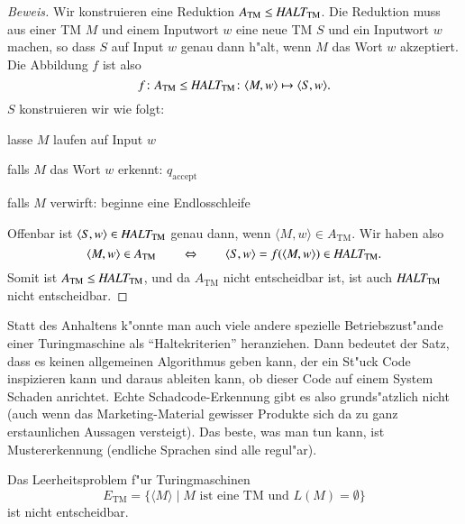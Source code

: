 \begin{proof}[Beweis]
Wir konstruieren eine Reduktion
$
A_{\text{TM}}
\le
\text{\it HALT}_{\text{TM}}
$.
Die Reduktion muss aus einer TM $M$ und einem Inputwort $w$ eine
neue TM $S$ und ein Inputwort $w$ machen, so dass $S$ auf
Input $w$ genau dann h"alt, wenn $M$ das Wort $w$ akzeptiert. Die Abbildung
$f$ ist also
\[
f\colon 
A_{\text{TM}}
\le
\text{\it HALT}_{\text{TM}}
\colon
\langle M,w\rangle\mapsto \langle S,w\rangle.
\]
$S$ konstruieren wir wie folgt:
\medskip
\begin{compactenum}
\item lasse $M$ laufen auf Input $w$
\item falls $M$ das Wort $w$ erkennt: $q_{\text{accept}}$
\item falls $M$ verwirft: beginne eine Endlosschleife
\end{compactenum}
\medskip
Offenbar ist
$\langle S,w\rangle\in \text{\it HALT}_{\text{TM}}$
genau dann, wenn $\langle M,w\rangle\in A_{\text{TM}}$.
Wir haben also
\[
\langle M,w\rangle\in A_{\text{TM}}
\qquad
\Leftrightarrow
\qquad
\langle S,w\rangle=f(\langle M,w\rangle)
\in \text{\it HALT}_{\text{TM}}.
\]
Somit ist 
$A_{\text{TM}}\le\text{\it HALT}_{\text{TM}}$, und da
$A_{\text{TM}}$ nicht entscheidbar ist, ist auch
$\text{\it HALT}_{\text{TM}}$ nicht entscheidbar.
\end{proof}
Statt des Anhaltens k"onnte man auch viele andere spezielle
Betriebszust"ande einer Turingmaschine als ``Haltekriterien''
heranziehen. Dann bedeutet der Satz, dass es keinen allgemeinen
Algorithmus geben kann, der ein St"uck Code inspizieren kann und
daraus ableiten kann, ob dieser Code auf einem System Schaden
anrichtet. Echte Schadcode-Erkennung gibt es also grunds"atzlich
nicht (auch wenn das Marketing-Material gewisser Produkte sich
da zu ganz erstaunlichen Aussagen versteigt). Das beste, was man
tun kann, ist Mustererkennung (endliche Sprachen sind alle regul"ar).

\begin{satz}
Das Leerheitsproblem f"ur Turingmaschinen
\[
E_{\text{TM}}
=
\{ \langle M\rangle\;|\; \text{$M$ ist eine TM und $L(M)=\emptyset$}\}
\]
ist nicht entscheidbar.
\end{satz}

